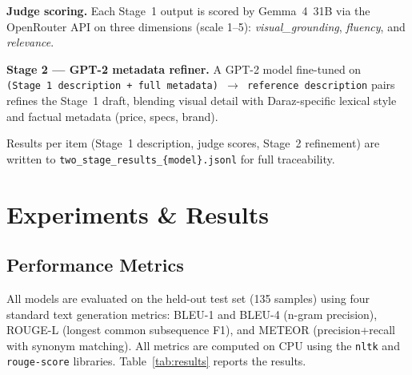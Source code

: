 \documentclass[12pt,a4paper]{article}
\begin{document}
\textbf{Judge scoring.} Each Stage~1 output is scored by Gemma~4~31B via the OpenRouter
API on three dimensions (scale 1--5): \emph{visual\_grounding}, \emph{fluency}, and
\emph{relevance}.

\textbf{Stage 2 --- GPT-2 metadata refiner.} A GPT-2 model fine-tuned on
\texttt{(Stage~1 description + full metadata) $\rightarrow$ reference description} pairs
refines the Stage~1 draft, blending visual detail with Daraz-specific lexical style
and factual metadata (price, specs, brand).

Results per item (Stage~1 description, judge scores, Stage~2 refinement) are written
to \texttt{two\_stage\_results\_\{model\}.jsonl} for full traceability.

\section{Experiments \& Results}

\subsection{Performance Metrics}

All models are evaluated on the held-out test set (135 samples) using four standard
text generation metrics: BLEU-1 and BLEU-4 (n-gram precision), ROUGE-L (longest
common subsequence F1), and METEOR (precision+recall with synonym matching).
All metrics are computed on CPU using the \texttt{nltk} and \texttt{rouge-score} libraries.
Table~\ref{tab:results} reports the results.
\end{document}
